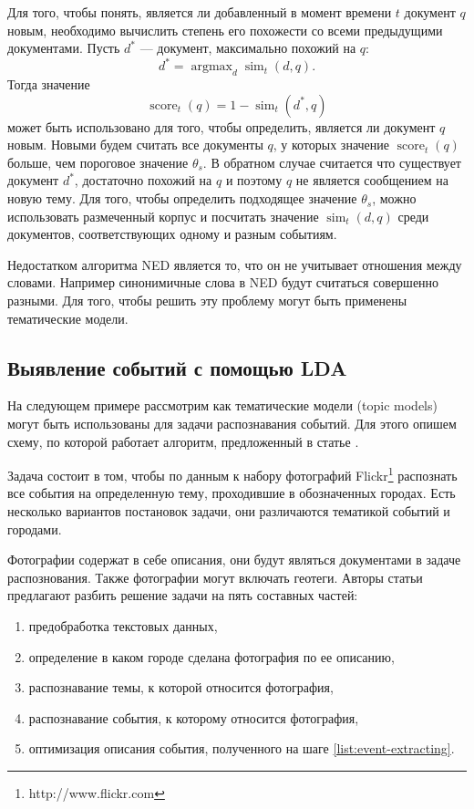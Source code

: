 \documentclass[12pt, a4paper]{article}
\DeclareMathOperator*{\argmax}{argmax}
\DeclareMathOperator{\score}{score}
\DeclareMathOperator{\simu}{sim}
\begin{document}
	Для того, чтобы понять, является ли добавленный в момент времени $t$ документ $q$ новым, необходимо вычислить степень его похожести со всеми предыдущими документами. Пусть $d^*$ --- документ, максимально похожий на $q$:
	\begin{equation}
	d^* = \argmax_d \simu_t (d,q).
	\end{equation}
	Тогда значение
	\begin{equation}
	\score_t(q) = 1 - \simu_t (d^*, q)
	\end{equation}
	может быть использовано для того, чтобы определить, является ли документ $q$ новым. Новыми будем считать все документы $q$, у которых значение $\score_t(q)$ больше, чем пороговое значение $\theta_s$. В обратном случае считается что существует документ $d^*$, достаточно похожий на $q$ и поэтому $q$ не является сообщением на новую тему. Для того, чтобы определить подходящее значение $\theta_s$, можно использовать размеченный корпус и посчитать значение $\simu_t (d,q)$ среди документов, соответствующих одному и разным событиям.
	
	Недостатком алгоритма NED является то, что он не учитывает отношения между словами. Например синонимичные слова в NED будут считаться совершенно разными. Для того, чтобы решить эту проблему могут быть применены тематические модели.
	
	\subsection{Выявление событий с помощью LDA}
  На следующем примере рассмотрим как тематические модели (topic models) могут быть использованы для задачи распознавания событий. Для этого опишем схему, по которой работает алгоритм, предложенный в статье  \cite{mediaeval}. 
  
  Задача состоит в том, чтобы по данным к  набору фотографий Flickr\footnote{http://www.flickr.com} распознать все события на определенную тему, проходившие в обозначенных городах. Есть несколько вариантов постановок задачи, они различаются тематикой событий и городами. 
  
  Фотографии содержат в себе описания, они будут являться документами в задаче распознования. Также фотографии могут включать геотеги. Авторы статьи предлагают разбить решение задачи на пять составных частей: 
  \begin{enumerate}
  \item предобработка текстовых данных,
  \item определение в каком городе сделана фотография по ее описанию,
  \item распознавание темы, к которой относится фотография,
  \item распознавание события, к которому относится фотография, \label{list:event-extracting}
  \item оптимизация описания события, полученного на шаге \ref{list:event-extracting}.
  \end{enumerate}
  
\end{document}
